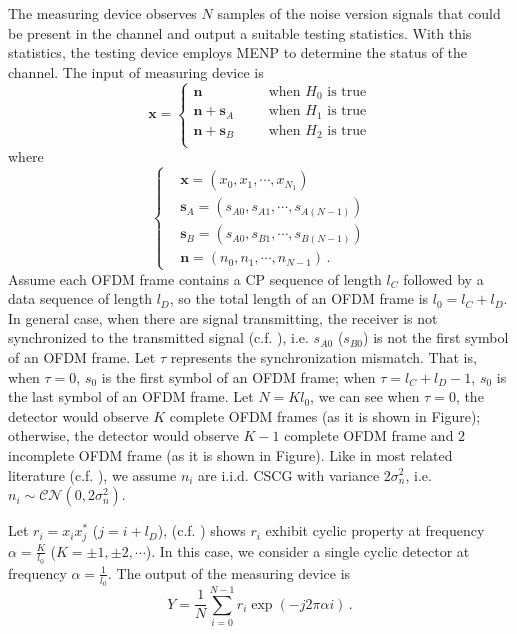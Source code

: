The measuring device observes $N$ samples of the noise version signals that could be present in the channel and output a suitable testing statistics. With this statistics, the testing device employs MENP to determine the status of the channel. The input of measuring device is
\begin{equation}
  \mathbf{x} = \begin{cases}
	\mathbf{n}\;\;\;\;\;\;&\text{when $H_0$ is true}\\
	\mathbf{n}+\mathbf{s}_A\;\;\;\;\;\;&\text{when $H_1$ is true}\\
	\mathbf{n}+\mathbf{s}_B\;\;\;\;\;\;&\text{when $H_2$ is true}\\
  \end{cases}
  \label{equ:1209a1}
\end{equation}
where 
\begin{equation}
  \begin{cases}
	&\mathbf{x} = (x_0, x_1, \cdots, x_{N_1})\\
	&\mathbf{s}_A = (s_{A0}, s_{A1}, \cdots, s_{A(N-1)})\\
	&\mathbf{s}_B = (s_{A0}, s_{B1}, \cdots, s_{B(N-1)})\\
	&\mathbf{n} = (n_{0}, n_{1}, \cdots, n_{N-1})\,.
  \end{cases}
  \label{xssn}
\end{equation}
Assume each OFDM frame contains a CP sequence of length $l_C$ followed by a data sequence of length $l_D$, so the total length of an OFDM frame is $l_0 = l_C+l_D$. In general case, when there are signal transmitting, the receiver is not synchronized to the transmitted signal (c.f. ), i.e. $s_{A0}$ ($s_{B0}$) is not the first symbol of an OFDM frame. Let $\tau$ represents the synchronization mismatch. That is, when $\tau = 0$, $s_0$ is the first symbol of an OFDM frame; when $\tau = l_C+l_D -1$, $s_0$ is the last symbol of an OFDM frame. Let $N = Kl_0$, we can see when $\tau=0$, the detector would observe $K$ complete  OFDM frames (as it is shown in Figure); otherwise, the detector would observe $K-1$ complete OFDM frame and $2$ incomplete OFDM frame (as it is shown in Figure). Like in most related literature (c.f. ), we assume  $n_i$ are i.i.d. CSCG with variance $2\sigma_n^2$, i.e. $n_i \sim \mathcal{CN}(0, 2\sigma_n^2)$. 

Let $r_i=x_ix_j^\ast$ ($j=i+l_D$), (c.f. ) shows $r_i$ exhibit cyclic property at frequency $\alpha = \frac{K}{l_0}$ ($K = \pm1, \pm2, \cdots$). In this case, we consider a single cyclic detector at frequency $\alpha = \frac{1}{l_0}$. The output of the measuring device is 
\begin{equation}
  Y = \frac{1}{N}\sum_{i=0}^{N-1} r_i\exp(-j2\pi\alpha i)\,.
  \label{cyclic_cov}
\end{equation}

